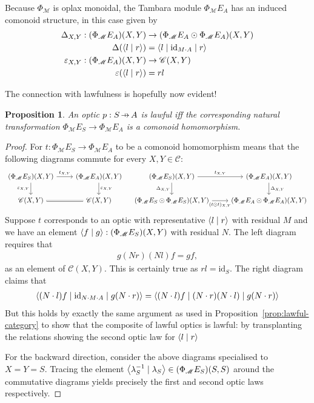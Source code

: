 \documentclass[11pt,letterpaper]{article}
\theoremstyle{plain}
\newtheorem{proposition}[theorem]{Proposition}
\theoremstyle{definition}
\newcommand{\C}{\mathscr{C}}
\newcommand{\M}{\mathscr{M}}
\newcommand{\Pastro}{\Phi}
\newcommand{\id}{\mathrm{id}}
\newcommand{\act}{\cdot}
\newcommand{\rep}[2]{{\ensuremath \left\langle #1 \mid #2 \right\rangle}}
\newcommand{\repthree}[3]{{\ensuremath \langle #1 \mid #2 \mid #3 \rangle}}
\newcommand{\hto}{\ensuremath{\,\mathaccent\shortmid\rightarrow\,}}
\begin{document}
Because $\Pastro_\M$ is oplax monoidal, the Tambara module $\Pastro_\M E_A$ has an induced comonoid structure, in this case given by
\begin{align*}
  \Delta_{X, Y} : (\Pastro_\M E_A)(X, Y) &\to (\Pastro_\M E_A \odot \Pastro_\M E_A)(X, Y) \\
  \Delta(\rep{l}{r}) &= \repthree{l}{\id_{M\act A}}{r} \\
  \varepsilon_{X, Y} : (\Pastro_\M E_A)(X, Y) &\to \C(X, Y) \\
  \varepsilon(\rep{l}{r}) &= rl
\end{align*}

The connection with lawfulness is hopefully now evident!

\begin{proposition}\label{prop:lawful-if-homomorphism}
  An optic $p : S \hto A$ is lawful iff the corresponding natural transformation $\Pastro_\M E_S \rightarrow \Pastro_\M E_A$ is a comonoid homomorphism.
\end{proposition}
\begin{proof}
For $t : \Pastro_\M E_S \rightarrow \Pastro_\M E_A$ to be a comonoid homomorphism means that the following diagrams commute for every $X, Y \in \C$:
  \[
    \begin{tikzcd}
    (\Pastro_\M E_S)(X, Y) \ar[r, "t_{X, Y}"] \ar[d, "\varepsilon_{X,Y}" swap] & (\Pastro_\M E_A)(X, Y) \ar[d, "\varepsilon_{X,Y}"] \\
    \C(X, Y) \ar[r, equals] & \C(X, Y)
    \end{tikzcd}
    \quad
    \begin{tikzcd}
      (\Pastro_\M E_S)(X, Y) \ar[r, "t_{X, Y}"] \ar[d, "\Delta_{X, Y}" swap] & (\Pastro_\M E_A)(X, Y) \ar[d, "\Delta_{X, Y}"] \\
      (\Pastro_\M E_S \odot \Pastro_\M E_S)(X, Y) \ar[r, "(t \odot t)_{X, Y}" swap] & (\Pastro_\M E_A \odot \Pastro_\M E_A)(X, Y)
    \end{tikzcd}
  \]
  Suppose $t$ corresponds to an optic with representative $\rep{l}{r}$ with residual $M$ and we have an element $\rep{f}{g} : (\Pastro_\M E_S)(X, Y)$ with residual $N$. The left diagram requires that 
  \begin{align*}
  g(Nr)(Nl)f = gf,
  \end{align*}
  as an element of $\C(X, Y)$. This is certainly true as $rl = \id_S$. The right diagram claims that 
  \begin{align*}
  \repthree{(N\act l)f}{\id_{N\act M\act A}}{g(N \act r)} = \repthree{(N\act l)f}{(N\act r)(N\act l)}{g(N\act r)}
  \end{align*}
  But this holds by exactly the same argument as used in Proposition~\ref{prop:lawful-category} to show that the composite of lawful optics is lawful: by transplanting the relations showing the second optic law for $\rep{l}{r}$

  For the backward direction, consider the above diagrams specialised to $X = Y = S$. Tracing the element $\rep{\lambda_S^{-1}}{\lambda_S} \in (\Pastro_\M E_S)(S, S)$ around the commutative diagrams yields precisely the first and second optic laws respectively.
\end{proof}
\end{document}
